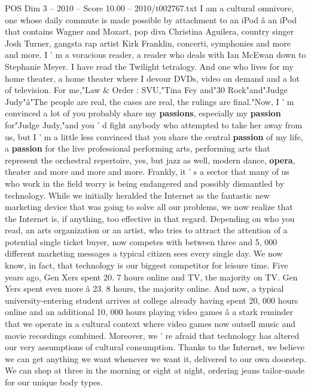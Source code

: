 \begin{textsample}{POS Dim 3 – 2010 – Score 10.00 – 2010/t002767.txt}  \label{ex:f3_pos_057}
I am a cultural omnivore, one whose daily commute is made possible by attachment to an iPod â an iPod that contains Wagner and Mozart, pop diva Christina Aguilera, country singer Josh Turner, gangsta rap artist Kirk Franklin, concerti, symphonies and more and more.
I ' m a voracious reader, a reader who deals with Ian McEwan down to Stephanie Meyer.
I have read the Twilight tetralogy.
And one who lives for my home theater, a home theater where I devour DVDs, video on demand and a lot of television.
For me,"Law \& Order : SVU,"Tina Fey and"30 Rock"and"Judge Judy"â"The people are real, the cases are real, the rulings are final."Now, I ' m convinced a lot of you probably share my \textbf{passions}, especially my \textbf{passion} for"Judge Judy,"and you ' d fight anybody who attempted to take her away from us, but I ' m a little less convinced that you share the central \textbf{passion} of my life, a \textbf{passion} for the live professional performing arts, performing arts that represent the orchestral repertoire, yes, but jazz as well, modern dance, \textbf{opera}, theater and more and more and more.
Frankly, it ' s a sector that many of us who work in the field worry is being endangered and possibly dismantled by technology.
While we initially heralded the Internet as the fantastic new marketing device that was going to solve all our problems, we now realize that the Internet is, if anything, too effective in that regard.
Depending on who you read, an arts organization or an artist, who tries to attract the attention of a potential single ticket buyer, now competes with between three and 5, 000 different marketing messages a typical citizen sees every single day.
We now know, in fact, that technology is our biggest competitor for leisure time.
Five years ago, Gen Xers spent 20. 7 hours online and TV, the majority on TV.
Gen Yers spent even more â 23. 8 hours, the majority online.
And now, a typical university-entering student arrives at college already having spent 20, 000 hours online and an additional 10, 000 hours playing video games â a stark reminder that we operate in a cultural context where video games now outsell music and movie recordings combined.
Moreover, we ' re afraid that technology has altered our very assumptions of cultural consumption.
Thanks to the Internet, we believe we can get anything we want whenever we want it, delivered to our own doorstep.
We can shop at three in the morning or eight at night, ordering jeans tailor-made for our unique body types.

\end{textsample}
